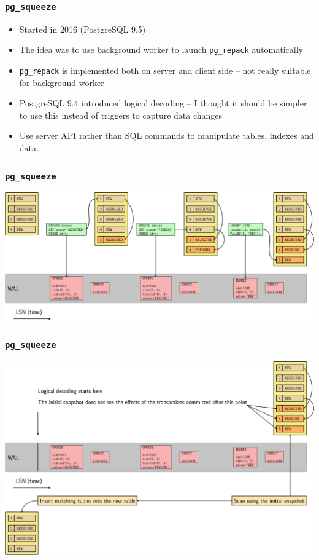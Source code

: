 \begin{frame}
        \frametitle{\texttt{pg\_squeeze}}
  \begin{itemize}
    \item Started in 2016 (PostgreSQL 9.5)
    \item The idea was to use background worker to launch \texttt{pg\_repack} automatically
    \item \texttt{pg\_repack} is implemented both on server and client side --
      not really suitable for background worker
    \item PostgreSQL 9.4 introduced logical decoding -- I thought it should be
      simpler to use this instead of triggers to capture data changes
    \item Use server API rather than SQL commands to manipulate tables,
      indexes and data.
  \end{itemize}
\end{frame}

\begin{frame}
  \frametitle{\texttt{pg\_squeeze}}
  \begin{center}
\includegraphics[height=\sizeforimages\textheight]{images/pg_squeeze_01.png}
  \end{center}
\end{frame}

\begin{frame}
  \frametitle{\texttt{pg\_squeeze}}
  \begin{center}
\includegraphics[height=\sizeforimages\textheight]{images/pg_squeeze_02.png}
  \end{center}
\end{frame}

